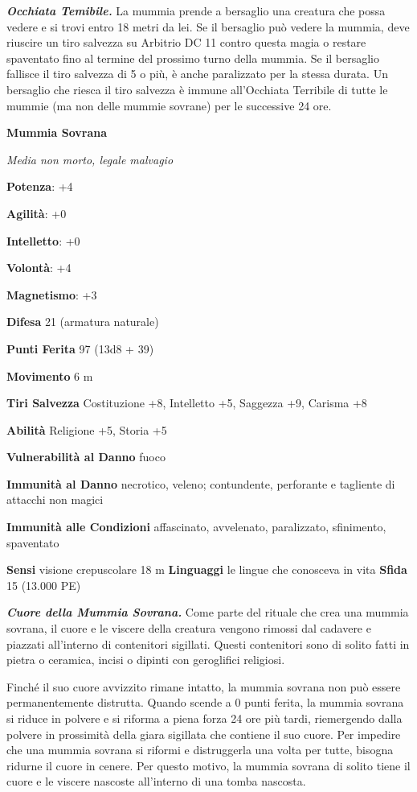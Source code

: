 \begin{multicols}{2}
\emph{\textbf{Occhiata Temibile.}} La mummia prende a bersaglio una
creatura che possa vedere e si trovi entro 18 metri da lei. Se il
bersaglio può vedere la mummia, deve riuscire un tiro salvezza su Arbitrio DC 11 contro questa magia o restare spaventato fino al termine
del prossimo turno della mummia. Se il bersaglio fallisce il tiro
salvezza di 5 o più, è anche paralizzato per la stessa durata. Un
bersaglio che riesca il tiro salvezza è immune all'Occhiata Terribile di
tutte le mummie (ma non delle mummie sovrane) per le successive 24 ore.

\textbf{Mummia Sovrana}

\emph{Media non morto, legale malvagio}

\textbf{Potenza}: +4

\textbf{Agilità}: +0

\textbf{Intelletto}: +0

\textbf{Volontà}: +4

\textbf{Magnetismo}: +3

\textbf{Difesa} 21 (armatura naturale)

\textbf{Punti Ferita} 97 (13d8 + 39)

\textbf{Movimento} 6 m

\textbf{Tiri Salvezza} Costituzione +8, Intelletto +5, Saggezza +9,
Carisma +8

\textbf{Abilità} Religione +5, Storia +5

\textbf{Vulnerabilità al Danno} fuoco

\textbf{Immunità al Danno} necrotico, veleno; contundente, perforante e
tagliente di attacchi non magici

\textbf{Immunità alle Condizioni} affascinato, avvelenato, paralizzato,
sfinimento, spaventato

\textbf{Sensi} visione crepuscolare 18 m
\textbf{Linguaggi} le lingue che conosceva in vita \textbf{Sfida} 15
(13.000 PE)

\emph{\textbf{Cuore della Mummia Sovrana.}} Come parte del rituale che
crea una mummia sovrana, il cuore e le viscere della creatura vengono
rimossi dal cadavere e piazzati all'interno di contenitori sigillati.
Questi contenitori sono di solito fatti in pietra o ceramica, incisi o
dipinti con geroglifici religiosi.

Finché il suo cuore avvizzito rimane intatto, la mummia sovrana non può
essere permanentemente distrutta. Quando scende a 0 punti ferita, la
mummia sovrana si riduce in polvere e si riforma a piena forza 24 ore
più tardi, riemergendo dalla polvere in prossimità della giara sigillata
che contiene il suo cuore. Per impedire che una mummia sovrana si
riformi e distruggerla una volta per tutte, bisogna ridurne il cuore in
cenere. Per questo motivo, la mummia sovrana di solito tiene il cuore e
le viscere nascoste all'interno di una tomba nascosta.


\end{multicols}
